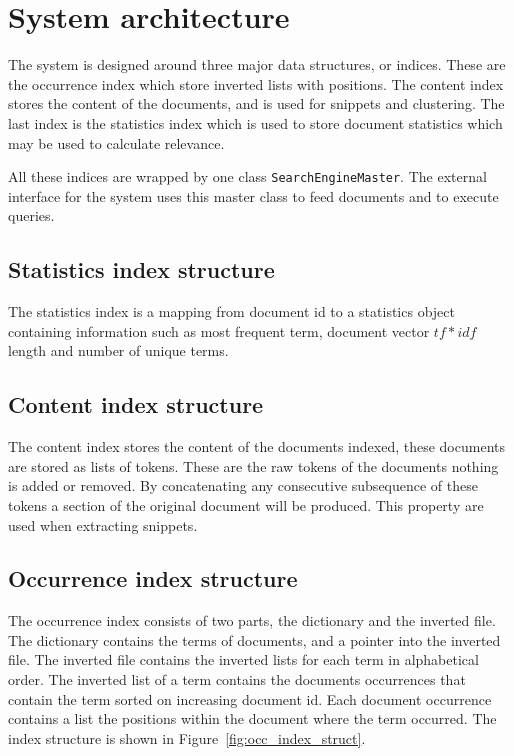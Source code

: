 \chapter{System architecture}
\label{sec:architecture}
\thispagestyle{fancy}
The system is designed around three major data structures, or indices. These are the occurrence index which store inverted lists with positions. The content index stores the content of the documents, and is used for snippets and clustering. The last index is the statistics index which is used to store document statistics which may be used to calculate relevance. 

All these indices are wrapped by one class \texttt{SearchEngineMaster}. The external interface for the system uses this master class to feed documents and to execute queries.  

\section{Statistics index structure}\label{sub:statistics_index_structure}
The statistics index is a mapping from document id to a statistics object containing information such as most frequent term, document vector $tf*idf$ length and number of unique terms.

\section{Content index structure}\label{sub:content_index_structure}
The content index stores the content of the documents indexed, these documents are stored as lists of tokens. These are the raw tokens of the documents nothing is added or removed. By concatenating any consecutive subsequence of these tokens a section of the original document will be produced. This property are used when extracting snippets.  

\section{Occurrence index structure}\label{sub:occurrence_index_structure}
The occurrence index consists of two parts, the dictionary and the inverted file. The dictionary contains the terms of documents, and a pointer into the inverted file. The inverted file contains the inverted lists for each term in alphabetical order. The inverted list of a term contains the documents occurrences that contain the term sorted on increasing document id. Each document occurrence contains a list the positions within the document where the term occurred. The index structure is shown in Figure~\ref{fig:occ_index_struct}.

